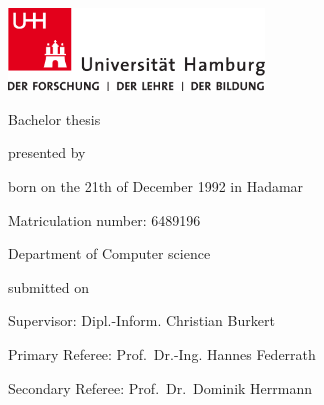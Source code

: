 \begin{titlepage}
    \includegraphics[width=6.8cm]{./pic/up-uhh-logo-u-2010-u-farbe-u-rgb.pdf}
    \begin{center}\Large
        \vfill
        Bachelor thesis
        \vfill

        \makeatletter
        {\Large\textsf{\textbf{\@title}}\par}
        \makeatother

        \vfill
        presented by
        \par\bigskip

        \makeatletter
        {\@author} \par
        \makeatother

        born on the 21th of December 1992 in Hadamar \par
        Matriculation number: 6489196 \par
        Department of Computer science
        \vfill

        \makeatletter
        submitted on {\@date}
        \makeatother

        \vfill
        Supervisor: Dipl.-Inform. Christian Burkert \par
        Primary Referee: Prof.\ Dr.-Ing. Hannes Federrath \par
        Secondary Referee: Prof.\ Dr.\ Dominik Herrmann

    \end{center}
\end{titlepage}
